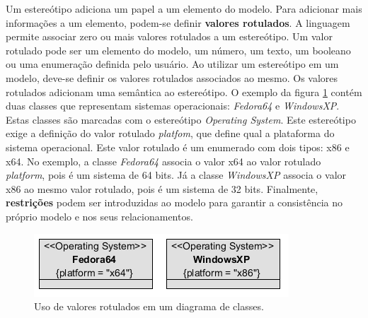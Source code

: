 Um estereótipo adiciona um papel a um elemento do modelo. Para adicionar mais informações a um elemento, podem-se definir \textbf{valores rotulados}.
A linguagem permite associar zero ou mais valores rotulados a um estereótipo. Um valor rotulado pode ser um elemento do modelo, um número, um texto, um booleano ou uma 
enumeração definida pelo usuário. Ao utilizar um estereótipo em um modelo, deve-se definir os valores rotulados associados ao mesmo. Os valores
rotulados adicionam uma semântica ao estereótipo. O exemplo da figura \ref{fig:tagged_values_1} contém duas classes que representam sistemas
operacionais: \textit{Fedora64} e \textit{WindowsXP}. Estas classes são marcadas com o estereótipo \textit{Operating System}. Este estereótipo 
exige a definição do valor rotulado \textit{platfom}, que define qual a plataforma do sistema operacional. Este valor rotulado é um enumerado com dois
tipos: x86 e x64. No exemplo, a classe \textit{Fedora64} associa o valor x64 ao valor rotulado \textit{platform}, pois é um sistema de 64 bits. Já a classe
\textit{WindowsXP} associa o valor x86 ao mesmo valor rotulado, pois é um sistema de 32 bits. Finalmente, \textbf{restrições} podem ser
introduzidas ao modelo para garantir a consistência no próprio modelo e nos seus relacionamentos.

\begin{figure}
	\centering
	\includegraphics{img/tagged_values_1.png}
	\caption{Uso de valores rotulados em um diagrama de classes.}\label{fig:tagged_values_1}
\end{figure}

